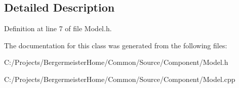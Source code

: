 \subsection{Detailed Description}


Definition at line 7 of file Model.\+h.



The documentation for this class was generated from the following files\+:\begin{DoxyCompactItemize}
\item 
C\+:/\+Projects/\+Bergermeister\+Home/\+Common/\+Source/\+Component/Model.\+h\item 
C\+:/\+Projects/\+Bergermeister\+Home/\+Common/\+Source/\+Component/Model.\+cpp\end{DoxyCompactItemize}
